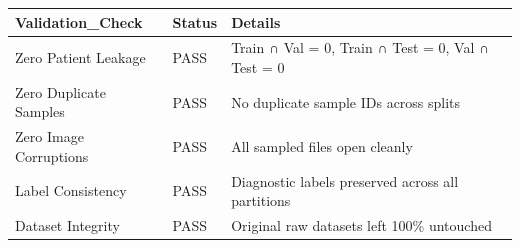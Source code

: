\begin{tabular}{lll}
\toprule
Validation\_Check & Status & Details \\
\midrule
Zero Patient Leakage & PASS & Train ∩ Val = 0, Train ∩ Test = 0, Val ∩ Test = 0 \\
Zero Duplicate Samples & PASS & No duplicate sample IDs across splits \\
Zero Image Corruptions & PASS & All sampled files open cleanly \\
Label Consistency & PASS & Diagnostic labels preserved across all partitions \\
Dataset Integrity & PASS & Original raw datasets left 100\% untouched \\
\bottomrule
\end{tabular}
